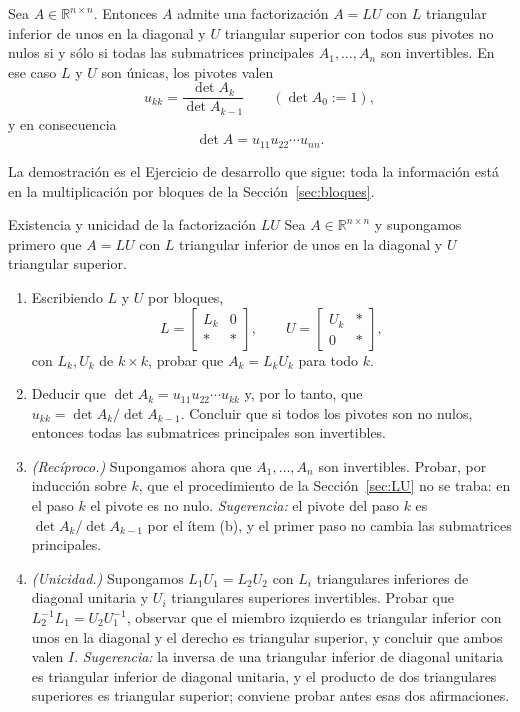 \begin{theorem}\label{teo:LU}
Sea $A\in\mathbb{R}^{n\times n}$. Entonces $A$ admite una factorización $A=LU$
con $L$ triangular inferior de unos en la diagonal y $U$ triangular superior con
todos sus pivotes no nulos si y sólo si todas las submatrices principales
$A_1,\dots,A_n$ son invertibles. En ese caso $L$ y $U$ son únicas, los pivotes
valen
\[
u_{kk} = \frac{\det A_k}{\det A_{k-1}}\qquad (\det A_0 := 1),
\]
y en consecuencia
\[
\det A = u_{11}u_{22}\cdots u_{nn} .
\]
\end{theorem}

La demostración es el Ejercicio de desarrollo que sigue: toda la información
está en la multiplicación por bloques de la Sección~\ref{sec:bloques}.

\begin{entrega}{Existencia y unicidad de la factorización $LU$}
Sea $A\in\mathbb{R}^{n\times n}$ y supongamos primero que $A = LU$ con $L$
triangular inferior de unos en la diagonal y $U$ triangular superior.

\begin{enumerate}[label=\textbf{(\alph*)},itemsep=3pt,topsep=4pt]
\item Escribiendo $L$ y $U$ por bloques,
\[
L = \begin{bmatrix} L_k & 0\\ \ast & \ast\end{bmatrix},
\qquad
U = \begin{bmatrix} U_k & \ast\\ 0 & \ast\end{bmatrix},
\]
con $L_k, U_k$ de $k\times k$, probar que $A_k = L_kU_k$ para todo $k$.

\item Deducir que $\det A_k = u_{11}u_{22}\cdots u_{kk}$ y, por lo tanto, que
$u_{kk} = \det A_k/\det A_{k-1}$. Concluir que si todos los pivotes son no
nulos, entonces todas las submatrices principales son invertibles.

\item \emph{(Recíproco.)} Supongamos ahora que $A_1,\dots,A_n$ son invertibles.
Probar, por inducción sobre $k$, que el procedimiento de la
Sección~\ref{sec:LU} no se traba: en el paso $k$ el pivote es no nulo.
\emph{Sugerencia:} el pivote del paso $k$ es $\det A_k/\det A_{k-1}$ por el
ítem (b), y el primer paso no cambia las submatrices principales.

\item \emph{(Unicidad.)} Supongamos $L_1U_1 = L_2U_2$ con $L_i$ triangulares
inferiores de diagonal unitaria y $U_i$ triangulares superiores invertibles.
Probar que $L_2^{-1}L_1 = U_2U_1^{-1}$, observar que el miembro izquierdo es
triangular inferior con unos en la diagonal y el derecho es triangular superior,
y concluir que ambos valen $I$. \emph{Sugerencia:} la inversa de una triangular
inferior de diagonal unitaria es triangular inferior de diagonal unitaria, y el
producto de dos triangulares superiores es triangular superior; conviene probar
antes esas dos afirmaciones.


\end{enumerate}
\end{entrega}
